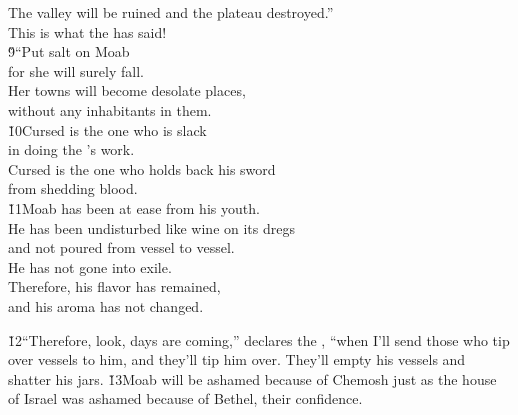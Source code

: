 \begin{poetry}
\poeml The valley will be ruined and the plateau destroyed.'' \\
\poemll    This is what the  has said! \\
\poeml \v{9}``Put salt on Moab \\
\poemll    for she will surely fall. \\
\poeml Her towns will become desolate places, \\
\poemll    without any inhabitants in them. \\
\poeml \v{10}Cursed is the one who is slack \\
\poemll    in doing the 's work. \\
\poeml Cursed is the one who holds back his sword \\
\poemll    from shedding blood. \\
\poeml \v{11}Moab has been at ease from his youth. \\
\poemll    He has been undisturbed like wine on its dregs \\
\poemlll       and not poured from vessel to vessel. \\
\poeml He has not gone into exile. \\
\poemll    Therefore, his flavor has remained, \\
\poemlll       and his aroma has not changed.
\end{poetry}

\v{12}``Therefore, look, days are coming,'' declares the , ``when I'll send those who tip over vessels to him, and they'll tip him over. They'll empty his vessels and shatter his jars. \v{13}Moab will be ashamed because of Chemosh just as the house of Israel was ashamed because of Bethel, their confidence.

